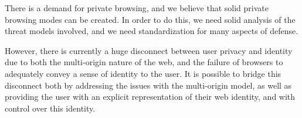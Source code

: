 \documentclass[letterpaper,11pt]{llncs}
\begin{document}
There is a demand for private browsing, and we believe that solid private
browsing modes can be created. In order to do this, we need solid analysis of
the threat models involved, and we need standardization for many aspects of
defense.

However, there is currently a huge disconnect between user privacy and
identity due to both the multi-origin nature of the web, and the failure of
browsers to adequately convey a sense of identity to the user. It is possible
to bridge this disconnect both by addressing the issues with the multi-origin
model, as well as providing the user with an explicit representation of their
web identity, and with control over this identity.


 

\clearpage
\appendix
\end{document}
